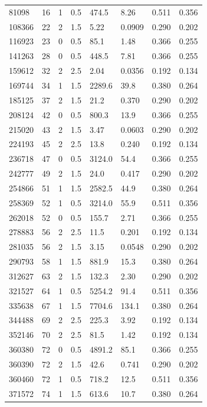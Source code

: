 \documentclass[preview]{standalone}
\begin{document}
{{\begin{tabular}{L{1.2cm}C{1.2cm} C{0.3cm}C{0.5cm} C{1.4cm}C{1.4cm} C{1.4cm}C{1.4cm}}
  81098  &    16  & 1     & 0.5 &  474.5  & 8.26  & 0.511 &  0.356   \\ 
  108366  &    22  & 2     & 1.5 &  5.22  & 0.0909  & 0.290 &  0.202   \\ 
  116923  &    23  & 0     & 0.5 &  85.1  & 1.48  & 0.366 &  0.255   \\ 
  141263  &    28  & 0     & 0.5 &  448.5  & 7.81  & 0.366 &  0.255   \\ 
  159612  &    32  & 2     & 2.5 &  2.04  & 0.0356  & 0.192 &  0.134   \\ 
  169744  &    34  & 1     & 1.5 &  2289.6  & 39.8  & 0.380 &  0.264   \\ 
  185125  &    37  & 2     & 1.5 &  21.2  & 0.370  & 0.290 &  0.202   \\ 
  208124  &    42  & 0     & 0.5 &  800.3  & 13.9  & 0.366 &  0.255   \\ 
  215020  &    43  & 2     & 1.5 &  3.47  & 0.0603  & 0.290 &  0.202   \\ 
  224193  &    45  & 2     & 2.5 &  13.8  & 0.240  & 0.192 &  0.134   \\ 
  236718  &    47  & 0     & 0.5 &  3124.0  & 54.4  & 0.366 &  0.255   \\ 
  242777  &    49  & 2     & 1.5 &  24.0  & 0.417  & 0.290 &  0.202   \\ 
  254866  &    51  & 1     & 1.5 &  2582.5  & 44.9  & 0.380 &  0.264   \\ 
  258369  &    52  & 1     & 0.5 &  3214.0  & 55.9  & 0.511 &  0.356   \\ 
  262018  &    52  & 0     & 0.5 &  155.7  & 2.71  & 0.366 &  0.255   \\ 
  278883  &    56  & 2     & 2.5 &  11.5  & 0.201  & 0.192 &  0.134   \\ 
  281035  &    56  & 2     & 1.5 &  3.15  & 0.0548  & 0.290 &  0.202   \\ 
  290793  &    58  & 1     & 1.5 &  881.9  & 15.3  & 0.380 &  0.264   \\ 
  312627  &    63  & 2     & 1.5 &  132.3  & 2.30  & 0.290 &  0.202   \\ 
  321527  &    64  & 1     & 0.5 &  5254.2  & 91.4  & 0.511 &  0.356   \\ 
  335638  &    67  & 1     & 1.5 &  7704.6  & 134.1  & 0.380 &  0.264   \\ 
  344488  &    69  & 2     & 2.5 &  225.3  & 3.92  & 0.192 &  0.134   \\ 
  352146  &    70  & 2     & 2.5 &  81.5  & 1.42  & 0.192 &  0.134   \\ 
  360380  &    72  & 0     & 0.5 &  4891.2  & 85.1  & 0.366 &  0.255   \\ 
  360390  &    72  & 2     & 1.5 &  42.6  & 0.741  & 0.290 &  0.202   \\ 
  360460  &    72  & 1     & 0.5 &  718.2  & 12.5  & 0.511 &  0.356   \\ 
  371572  &    74  & 1     & 1.5 &  613.6  & 10.7  & 0.380 &  0.264   \\ 
\hline 
\end{tabular} 

}}
\end{document}
